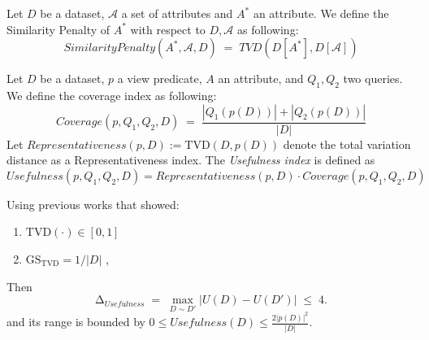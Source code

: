\begin{definition}
Let $D$ be a dataset, $\mathcal{A}$ a set of attributes and $A^*$ an attribute.
We define the Similarity Penalty of $A^*$ with respect to $D, \mathcal{A}$ as following:
\begin{equation}
SimilarityPenalty(A^*,\mathcal{A}, D) \;=\; TVD(D[A^*], D[\mathcal{A}])
\end{equation}
\end{definition}

\begin{definition}
Let $D$ be a dataset, $p$ a view predicate, $A$ an attribute, and $Q_1,Q_2$ two queries.
We define the coverage index as following:
\begin{equation}
Coverage(p,Q_1, Q_2, D) \;=\; \frac{|Q_1(p(D))| + |Q_2(p(D))|}{|D|}
\end{equation}
Let $Representativeness(p, D) := \mathrm{TVD}(D, p(D))$ denote the total variation distance as a Representativeness index.  
The \emph{Usefulness index} is defined as
\begin{equation}
Usefulness(p,Q_1,Q_2,D) = Representativeness(p,D) \cdot Coverage(p,Q_1,Q_2,D)
\end{equation}
\end{definition}

\begin{proposition}
Using previous works that showed: 
\begin{enumerate}
  \item $\mathrm{TVD}(\cdot) \in [0,1]$
  \item $\mathrm{GS}_{\mathrm{TVD}} = 1/|D|$ ,
\end{enumerate}
Then
\[
\mathrm{\Delta}_{Usefulness} \;=\; \max_{D\sim D'} |U(D) - U(D')| \; \leq \; 4.
\]
and its range is bounded by $0 \le Usefulness(D) \le \frac{2|p(D)|^2}{|D|}$.
\end{proposition}

